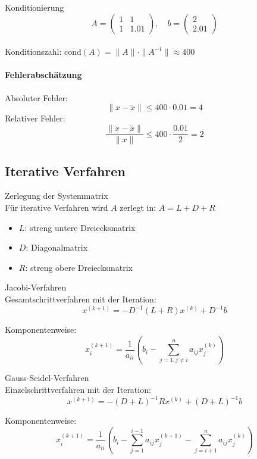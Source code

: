 \begin{example2}{Konditionierung}
$$A = \begin{pmatrix}
1 & 1\\
1 & 1.01
\end{pmatrix}, \quad b = \begin{pmatrix}
2\\
2.01
\end{pmatrix}$$
\vspace{2mm}\\
Konditionszahl:
$\text{cond}(A) = \|A\| \cdot \|A^{-1}\| \approx 400$
\vspace{2mm}\\
\paragraph{Fehlerabschätzung}
Absoluter Fehler:
$$\|x - \tilde{x}\| \leq 400 \cdot 0.01 = 4$$
Relativer Fehler:
$$\frac{\|x - \tilde{x}\|}{\|x\|} \leq 400 \cdot \frac{0.01}{2} = 2$$
\end{example2}

\subsection{Iterative Verfahren}

\begin{definition}{Zerlegung der Systemmatrix}\\
Für iterative Verfahren wird $A$ zerlegt in: $A = L + D + R$
\begin{itemize}
    \item $L$: streng untere Dreiecksmatrix
    \item $D$: Diagonalmatrix
    \item $R$: streng obere Dreiecksmatrix
\end{itemize}
\end{definition}

\begin{concept}{Jacobi-Verfahren}\\
Gesamtschrittverfahren mit der Iteration:
$$x^{(k+1)} = -D^{-1}(L + R)x^{(k)} + D^{-1}b$$

Komponentenweise:
$$x_i^{(k+1)} = \frac{1}{a_{ii}}\left(b_i - \sum_{j=1,j\neq i}^n a_{ij}x_j^{(k)}\right)$$
\end{concept}

\begin{concept}{Gauss-Seidel-Verfahren}\\
Einzelschrittverfahren mit der Iteration:
$$x^{(k+1)} = -(D+L)^{-1}Rx^{(k)} + (D+L)^{-1}b$$

Komponentenweise:
$$x_i^{(k+1)} = \frac{1}{a_{ii}}\left(b_i - \sum_{j=1}^{i-1} a_{ij}x_j^{(k+1)} - \sum_{j=i+1}^n a_{ij}x_j^{(k)}\right)$$
\end{concept}

